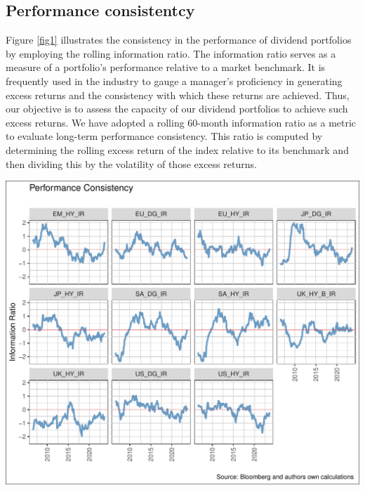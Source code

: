 \documentclass[12pt,preprint, authoryear]{elsarticle}
\let\origfigure\figure
\let\endorigfigure\endfigure
\renewenvironment{figure}[1][2] {
    \expandafter\origfigure\expandafter[H]
} {
    \endorigfigure
}
\numberwithin{equation}{section}
\numberwithin{figure}{section}
\numberwithin{table}{section}
\begin{document}
\hypertarget{performance-consistentcy}{%
\subsection{Performance consistentcy}\label{performance-consistentcy}}

Figure \ref{fig1} illustrates the consistency in the performance of
dividend portfolios by employing the rolling information ratio. The
information ratio serves as a measure of a portfolio's performance
relative to a market benchmark. It is frequently used in the industry to
gauge a manager's proficiency in generating excess returns and the
consistency with which these returns are achieved. Thus, our objective
is to assess the capacity of our dividend portfolios to achieve such
excess returns. We have adopted a rolling 60-month information ratio as
a metric to evaluate long-term performance consistency. This ratio is
computed by determining the rolling excess return of the index relative
to its benchmark and then dividing this by the volatility of those
excess returns.

\begin{figure}[H]

\includegraphics{ThesisWriteUp_files/figure-latex/unnamed-chunk-1-1} \hfill{}

\caption{Rolling 3 Year Returns \label{fig1}}\label{fig:unnamed-chunk-1}
\end{figure}
\end{document}

